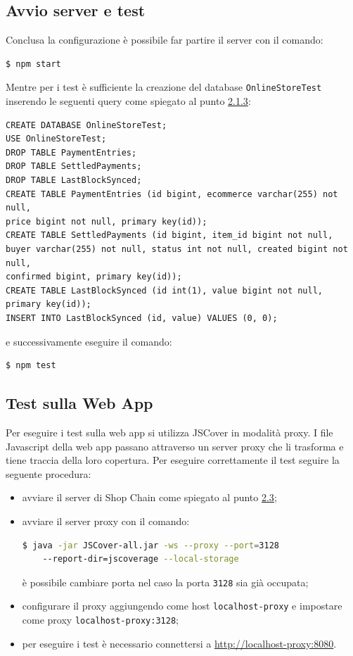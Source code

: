 \documentclass[a4paper, 12pt]{article}
\begin{document}
\subsection{Avvio server e test}
\label{sec:avvio}
Conclusa la configurazione è possibile far partire il server con il comando:
\begin{lstlisting}[language=bash]
  $ npm start
\end{lstlisting}
Mentre per i test è sufficiente la creazione del database \texttt{OnlineStoreTest} inserendo le seguenti query come spiegato al punto \hyperref[sec:db]{2.1.3}:
\begin{verbatim}
CREATE DATABASE OnlineStoreTest;
USE OnlineStoreTest;
DROP TABLE PaymentEntries;
DROP TABLE SettledPayments;
DROP TABLE LastBlockSynced;
CREATE TABLE PaymentEntries (id bigint, ecommerce varchar(255) not null,
price bigint not null, primary key(id));
CREATE TABLE SettledPayments (id bigint, item_id bigint not null,
buyer varchar(255) not null, status int not null, created bigint not null,
confirmed bigint, primary key(id));
CREATE TABLE LastBlockSynced (id int(1), value bigint not null, primary key(id));
INSERT INTO LastBlockSynced (id, value) VALUES (0, 0);
\end{verbatim}
e successivamente eseguire il comando:
\begin{lstlisting}[language=bash]
  $ npm test
\end{lstlisting}
\subsection{Test sulla Web App}
Per eseguire i test sulla web app si utilizza JSCover in modalità proxy. I file Javascript della web app passano attraverso un server proxy che li trasforma e tiene traccia della loro copertura. Per eseguire correttamente il test seguire la seguente procedura:
\begin{itemize}
  \item avviare il server di Shop Chain come spiegato al punto \hyperref[sec:avvio]{2.3};
  \item avviare il server proxy con il comando:
  \begin{lstlisting}[language=bash]
    $ java -jar JSCover-all.jar -ws --proxy --port=3128
    --report-dir=jscoverage --local-storage
  \end{lstlisting}
  è possibile cambiare porta nel caso la porta \verb|3128| sia già occupata;
  \item configurare il proxy aggiungendo come host \verb|localhost-proxy| e impostare come proxy \verb|localhost-proxy:3128|;
  \item per eseguire i test è necessario connettersi a \url{http://localhost-proxy:8080}.
\end{itemize}
\end{document}
